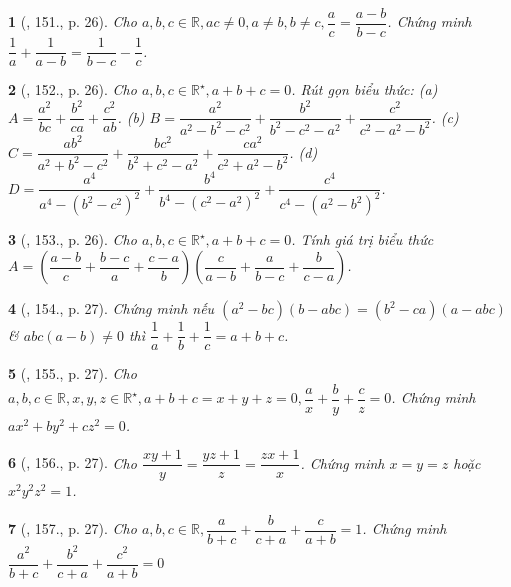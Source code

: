 \documentclass{article}
\newtheorem{baitoan}{}
\begin{document}
\begin{baitoan}[\cite{Binh_Toan_8_tap_1}, 151., p. 26]
	Cho $a,b,c\in\mathbb{R},ac\ne0,a\ne b,b\ne c,\dfrac{a}{c} = \dfrac{a - b}{b - c}$. Chứng minh $\dfrac{1}{a} + \dfrac{1}{a - b} = \dfrac{1}{b - c} - \dfrac{1}{c}$.
\end{baitoan}

\begin{baitoan}[\cite{Binh_Toan_8_tap_1}, 152., p. 26]
	Cho $a,b,c\in\mathbb{R}^\star,a + b + c = 0$. Rút gọn biểu thức: (a) $A = \dfrac{a^2}{bc} + \dfrac{b^2}{ca} + \dfrac{c^2}{ab}$. (b) $B = \dfrac{a^2}{a^2 - b^2 - c^2} + \dfrac{b^2}{b^2 - c^2 - a^2} + \dfrac{c^2}{c^2 - a^2 - b^2}$. (c) $C = \dfrac{ab^2}{a^2 + b^2 - c^2} + \dfrac{bc^2}{b^2 + c^2 - a^2} + \dfrac{ca^2}{c^2 + a^2 - b^2}$. (d) $D = \dfrac{a^4}{a^4 - (b^2 - c^2)^2} + \dfrac{b^4}{b^4 - (c^2 - a^2)^2} + \dfrac{c^4}{c^4 - (a^2 - b^2)^2}$. 
\end{baitoan}

\begin{baitoan}[\cite{Binh_Toan_8_tap_1}, 153., p. 26]
	Cho $a,b,c\in\mathbb{R}^\star,a + b + c = 0$. Tính giá trị biểu thức $A = \left(\dfrac{a - b}{c} + \dfrac{b - c}{a} + \dfrac{c - a}{b}\right)\left(\dfrac{c}{a - b} + \dfrac{a}{b - c} + \dfrac{b}{c - a}\right)$.
\end{baitoan}

\begin{baitoan}[\cite{Binh_Toan_8_tap_1}, 154., p. 27]
	Chứng minh nếu $(a^2 - bc)(b - abc) = (b^2 - ca)(a - abc)$ \& $abc(a - b)\ne0$ thì $\dfrac{1}{a} + \dfrac{1}{b} + \dfrac{1}{c} = a + b + c$.
\end{baitoan}

\begin{baitoan}[\cite{Binh_Toan_8_tap_1}, 155., p. 27]
	Cho $a,b,c\in\mathbb{R},x,y,z\in\mathbb{R}^\star,a + b + c = x + y + z = 0,\dfrac{a}{x} + \dfrac{b}{y} + \dfrac{c}{z} = 0$. Chứng minh $ax^2 + by^2 + cz^2 = 0$.
\end{baitoan}

\begin{baitoan}[\cite{Binh_Toan_8_tap_1}, 156., p. 27]
	Cho $\dfrac{xy + 1}{y} = \dfrac{yz + 1}{z} = \dfrac{zx + 1}{x}$. Chứng minh $x = y = z$ hoặc $x^2y^2z^2 = 1$.
\end{baitoan}

\begin{baitoan}[\cite{Binh_Toan_8_tap_1}, 157., p. 27]
	Cho $a,b,c\in\mathbb{R},\dfrac{a}{b + c} + \dfrac{b}{c + a} + \dfrac{c}{a + b} = 1$. Chứng minh $\dfrac{a^2}{b + c} + \dfrac{b^2}{c + a} + \dfrac{c^2}{a + b} = 0$
\end{baitoan}
\end{document}
